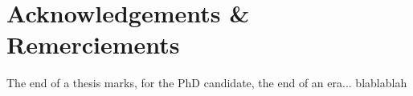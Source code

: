 \newpage
\thispagestyle{empty}
\mbox{}
\newpage


\chapter*{Acknowledgements \& Remerciements}
\label{chap:remerciements}
 {}

{\fontsize{11}{13}\selectfont
The end of a thesis marks, for the PhD candidate, the end of an era... blablablah 

\newpage
\thispagestyle{empty}
\mbox{}
\newpage
}
